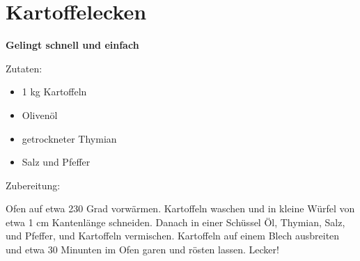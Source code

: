 \section{Kartoffelecken}

\textbf{Gelingt schnell und einfach}

Zutaten:
\begin{itemize}
    \item 1 kg Kartoffeln
    \item Olivenöl
    \item getrockneter Thymian
    \item Salz und Pfeffer
\end{itemize}

\noindent Zubereitung:

\noindent Ofen auf etwa 230 Grad vorwärmen. Kartoffeln waschen und in kleine
Würfel von etwa 1 cm Kantenlänge schneiden. Danach in einer Schüssel Öl,
Thymian, Salz, und Pfeffer, und Kartoffeln vermischen. Kartoffeln auf einem
Blech ausbreiten und etwa 30 Minunten im Ofen garen und rösten lassen. Lecker!

\newpage
\mbox{}
\vfill
\begin{center}
\end{center}
\vfill
\mbox{ }
\newpage
